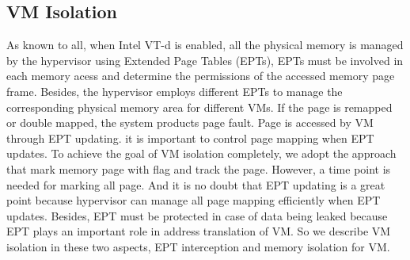 \documentclass[conference]{IEEEtran}
\begin{document}

\subsection{VM Isolation}\label{VMISolation}

As known to all, when Intel VT-d is enabled, all the physical memory is managed by the hypervisor using Extended Page Tables (EPTs), EPTs must be involved in each memory acess and determine the permissions of the accessed memory page frame. Besides, the hypervisor employs different EPTs to manage the corresponding physical memory area for different VMs. If the page is remapped or double mapped, the system products page fault. Page is accessed by VM through EPT updating.
it is important to control page mapping when EPT updates. To achieve the goal of VM isolation completely, we adopt the approach that mark memory page with flag and track the page. However, a time point is needed for marking all page. And it is no doubt that EPT updating is a great point because hypervisor can manage all page mapping efficiently when EPT updates. Besides, EPT must be protected in case of data being leaked because EPT plays an important role in address translation of VM. So we describe VM isolation in these two aspects, EPT interception and memory isolation for VM.
\end{document}
